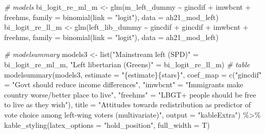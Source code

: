 \documentclass[
]{article}
\newenvironment{Shaded}{\begin{snugshade}}{\end{snugshade}}
\newcommand{\AttributeTok}[1]{\textcolor[rgb]{0.77,0.63,0.00}{#1}}
\newcommand{\CommentTok}[1]{\textcolor[rgb]{0.56,0.35,0.01}{\textit{#1}}}
\newcommand{\FunctionTok}[1]{\textcolor[rgb]{0.00,0.00,0.00}{#1}}
\newcommand{\NormalTok}[1]{#1}
\newcommand{\OtherTok}[1]{\textcolor[rgb]{0.56,0.35,0.01}{#1}}
\newcommand{\SpecialCharTok}[1]{\textcolor[rgb]{0.00,0.00,0.00}{#1}}
\newcommand{\StringTok}[1]{\textcolor[rgb]{0.31,0.60,0.02}{#1}}
\begin{document}
\begin{Shaded}
\begin{Highlighting}[]
\CommentTok{\# models }
\NormalTok{bi\_logit\_re\_ml\_m }\OtherTok{\textless{}{-}} \FunctionTok{glm}\NormalTok{(m\_left\_dummy }\SpecialCharTok{\textasciitilde{}}\NormalTok{ gincdif }\SpecialCharTok{+}\NormalTok{ imwbcnt }\SpecialCharTok{+}\NormalTok{ freehms, }
                      \AttributeTok{family =} \FunctionTok{binomial}\NormalTok{(}\AttributeTok{link =} \StringTok{"logit"}\NormalTok{), }
                      \AttributeTok{data =}\NormalTok{ ah21\_mod\_left)}
\NormalTok{bi\_logit\_re\_ll\_m }\OtherTok{\textless{}{-}} \FunctionTok{glm}\NormalTok{(left\_lib\_dummy }\SpecialCharTok{\textasciitilde{}}\NormalTok{ gincdif }\SpecialCharTok{+}\NormalTok{ gincdif }\SpecialCharTok{+}\NormalTok{ imwbcnt }\SpecialCharTok{+}\NormalTok{ freehms, }
                      \AttributeTok{family =} \FunctionTok{binomial}\NormalTok{(}\AttributeTok{link =} \StringTok{"logit"}\NormalTok{), }
                      \AttributeTok{data =}\NormalTok{ ah21\_mod\_left)}

\CommentTok{\# modelsummary}
\NormalTok{models3 }\OtherTok{\textless{}{-}} \FunctionTok{list}\NormalTok{(}\StringTok{"Mainstream left (SPD)"} \OtherTok{=}\NormalTok{ bi\_logit\_re\_ml\_m, }
                \StringTok{"Left libertarian (Greens)"} \OtherTok{=}\NormalTok{ bi\_logit\_re\_ll\_m)}
\CommentTok{\# table }
\FunctionTok{modelsummary}\NormalTok{(models3, }
             \AttributeTok{estimate =} \StringTok{"\{estimate\}\{stars\}"}\NormalTok{,}
             \AttributeTok{coef\_map =} \FunctionTok{c}\NormalTok{(}\StringTok{"gincdif"} \OtherTok{=} \StringTok{"Gov\textquotesingle{}t should reduce income differences"}\NormalTok{,}
                          \StringTok{"imwbcnt"} \OtherTok{=} \StringTok{"Immigrants make country worse/better place to live"}\NormalTok{, }
                          \StringTok{"freehms"} \OtherTok{=} \StringTok{"LBGT+ people should be free to live as they wish"}\NormalTok{), }
             \AttributeTok{title =} \StringTok{"Attitudes towards redistribution as predictor of vote choice among left{-}wing voters (multivariate)"}\NormalTok{, }
             \AttributeTok{output =} \StringTok{"kableExtra"}\NormalTok{) }\SpecialCharTok{\%\textgreater{}\%}
  \FunctionTok{kable\_styling}\NormalTok{(}\AttributeTok{latex\_options =} \StringTok{"hold\_position"}\NormalTok{, }\AttributeTok{full\_width =}\NormalTok{ T) }
\end{Highlighting}
\end{Shaded}
\end{document}
